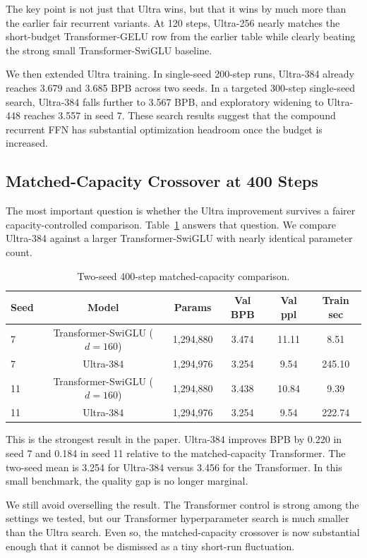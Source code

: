 \documentclass[11pt]{article}
\begin{document}
The key point is not just that Ultra wins, but that it wins by much more than
the earlier fair recurrent variants. At 120 steps, Ultra-256 nearly matches the
short-budget Transformer-GELU row from the earlier table while clearly beating
the strong small Transformer-SwiGLU baseline.

We then extended Ultra training. In single-seed 200-step runs, Ultra-384
already reaches 3.679 and 3.685 BPB across two seeds. In a targeted 300-step
single-seed search, Ultra-384 falls further to 3.567 BPB, and exploratory
widening to Ultra-448 reaches 3.557 in seed 7. These search results suggest
that the compound recurrent FFN has substantial optimization headroom once the
budget is increased.

\subsection{Matched-Capacity Crossover at 400 Steps}
The most important question is whether the Ultra improvement survives a fairer
capacity-controlled comparison. Table~\ref{tab:ultra400} answers that question.
We compare Ultra-384 against a larger Transformer-SwiGLU with nearly identical
parameter count.

\begin{table}[t]
  \centering
  \caption{Two-seed 400-step matched-capacity comparison.}
  \label{tab:ultra400}
  \begin{tabular}{lccccc}
    \toprule
    Seed & Model & Params & Val BPB & Val ppl & Train sec \\
    \midrule
    7 & Transformer-SwiGLU ($d=160$) & 1,294,880 & 3.474 & 11.11 & 8.51 \\
    7 & Ultra-384 & 1,294,976 & 3.254 & 9.54 & 245.10 \\
    11 & Transformer-SwiGLU ($d=160$) & 1,294,880 & 3.438 & 10.84 & 9.39 \\
    11 & Ultra-384 & 1,294,976 & 3.254 & 9.54 & 222.74 \\
    \bottomrule
  \end{tabular}
\end{table}

This is the strongest result in the paper. Ultra-384 improves BPB by 0.220 in
seed 7 and 0.184 in seed 11 relative to the matched-capacity Transformer. The
two-seed mean is 3.254 for Ultra-384 versus 3.456 for the Transformer. In this
small benchmark, the quality gap is no longer marginal.

We still avoid overselling the result. The Transformer control is strong among
the settings we tested, but our Transformer hyperparameter search is much
smaller than the Ultra search. Even so, the matched-capacity crossover is now
substantial enough that it cannot be dismissed as a tiny short-run fluctuation.
\end{document}

